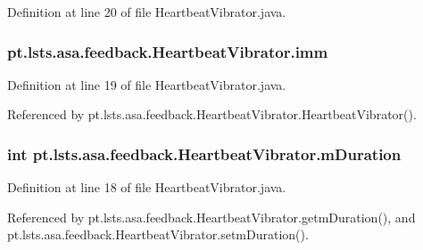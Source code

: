 Definition at line 20 of file Heartbeat\+Vibrator.\+java.

\hypertarget{classpt_1_1lsts_1_1asa_1_1feedback_1_1HeartbeatVibrator_a2a329113447103743dacd656ae38963f}{}
\subsubsection[{imm}]{ pt.\+lsts.\+asa.\+feedback.\+Heartbeat\+Vibrator.\+imm\hspace{0.3cm}{\ttfamily [private]}}\label{classpt_1_1lsts_1_1asa_1_1feedback_1_1HeartbeatVibrator_a2a329113447103743dacd656ae38963f}


Definition at line 19 of file Heartbeat\+Vibrator.\+java.



Referenced by pt.\+lsts.\+asa.\+feedback.\+Heartbeat\+Vibrator.\+Heartbeat\+Vibrator().

\hypertarget{classpt_1_1lsts_1_1asa_1_1feedback_1_1HeartbeatVibrator_abba287258134a26d6739c0adb62c5f1d}{}
\subsubsection[{m\+Duration}]{\setlength{\rightskip}{0pt plus 5cm}int pt.\+lsts.\+asa.\+feedback.\+Heartbeat\+Vibrator.\+m\+Duration\hspace{0.3cm}{\ttfamily [private]}}\label{classpt_1_1lsts_1_1asa_1_1feedback_1_1HeartbeatVibrator_abba287258134a26d6739c0adb62c5f1d}


Definition at line 18 of file Heartbeat\+Vibrator.\+java.



Referenced by pt.\+lsts.\+asa.\+feedback.\+Heartbeat\+Vibrator.\+getm\+Duration(), and pt.\+lsts.\+asa.\+feedback.\+Heartbeat\+Vibrator.\+setm\+Duration().

\hypertarget{classpt_1_1lsts_1_1asa_1_1feedback_1_1HeartbeatVibrator_a4482c3c6c9095b1103daa19bbc3a0fcd}{}
